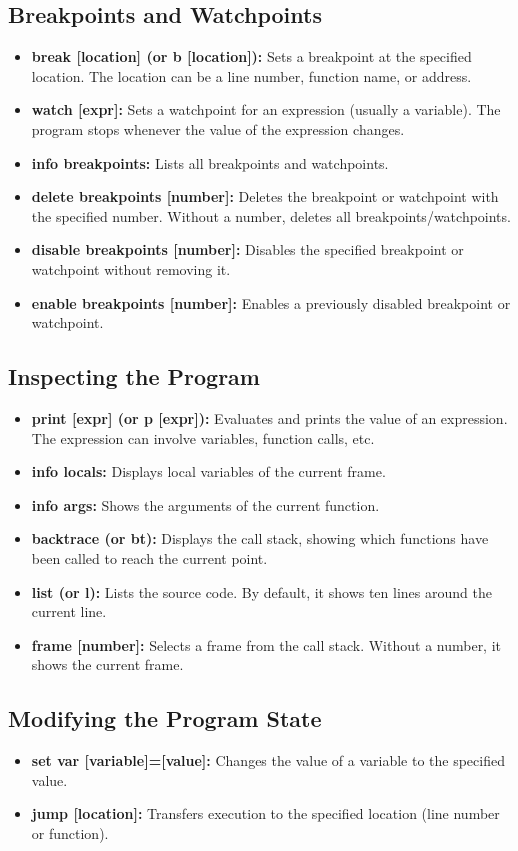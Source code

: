 \documentclass{report}
\begin{document}
     \subsection{Breakpoints and Watchpoints}
     \begin{itemize}
         \item \textbf{break [location] (or b [location]):} Sets a breakpoint at the specified location. The location can be a line number, function name, or address.
         \item \textbf{watch [expr]:} Sets a watchpoint for an expression (usually a variable). The program stops whenever the value of the expression changes.
         \item \textbf{info breakpoints:} Lists all breakpoints and watchpoints.
         \item \textbf{delete breakpoints [number]:} Deletes the breakpoint or watchpoint with the specified number. Without a number, deletes all breakpoints/watchpoints.
         \item \textbf{disable breakpoints [number]:} Disables the specified breakpoint or watchpoint without removing it.
         \item \textbf{enable breakpoints [number]:} Enables a previously disabled breakpoint or watchpoint.
     \end{itemize}
     \bigbreak \noindent 
     \subsection{Inspecting the Program}
     \begin{itemize}
         \item \textbf{print [expr] (or p [expr]):} Evaluates and prints the value of an expression. The expression can involve variables, function calls, etc.
         \item \textbf{info locals:} Displays local variables of the current frame.
         \item \textbf{info args:} Shows the arguments of the current function.
         \item \textbf{backtrace (or bt):} Displays the call stack, showing which functions have been called to reach the current point.
         \item \textbf{list (or l):} Lists the source code. By default, it shows ten lines around the current line.
         \item \textbf{frame [number]:} Selects a frame from the call stack. Without a number, it shows the current frame.
     \end{itemize}
     \bigbreak \noindent 
     \subsection{Modifying the Program State}
     \begin{itemize}
         \item \textbf{set var [variable]=[value]:} Changes the value of a variable to the specified value.
         \item \textbf{jump [location]:} Transfers execution to the specified location (line number or function).
     \end{itemize}
\end{document}
